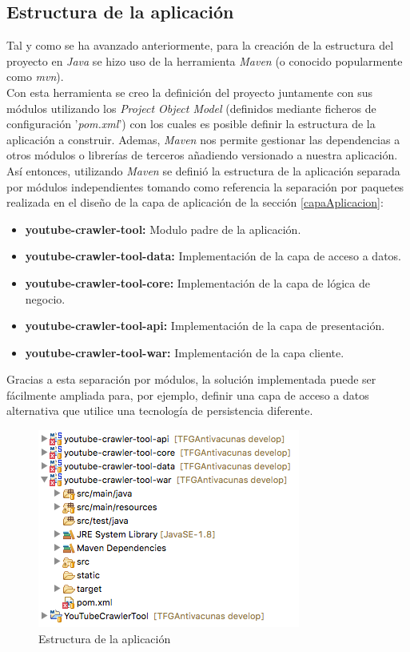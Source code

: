 \documentclass[11pt,a4paper]{article}
\begin{document}
\subsection{Estructura de la aplicación}
Tal y como se ha avanzado anteriormente, para la creación de la estructura del proyecto en \textit{Java} se hizo uso de la herramienta \textit{Maven} (o conocido popularmente como \textit{mvn}).
\\

Con esta herramienta se creo la definición del proyecto juntamente con sus módulos utilizando los \textit{Project Object Model} (definidos mediante ficheros de configuración '\textit{pom.xml}') con los cuales es posible definir la estructura de la aplicación a construir. Ademas, \textit{Maven} nos permite gestionar las dependencias a otros módulos o librerías de terceros añadiendo versionado a nuestra aplicación.
\\

Así entonces, utilizando \textit{Maven} se definió la estructura de la aplicación separada por módulos independientes tomando como referencia la separación por paquetes realizada en el diseño de la capa de aplicación de la sección \ref{capaAplicacion}:

\begin{itemize}
\item \textbf{youtube-crawler-tool:} Modulo padre de la aplicación.
\item \textbf{youtube-crawler-tool-data:} Implementación de la capa de acceso a datos.
\item \textbf{youtube-crawler-tool-core:} Implementación de la capa de lógica de negocio.
\item \textbf{youtube-crawler-tool-api:} Implementación de la capa de presentación.
\item \textbf{youtube-crawler-tool-war:} Implementación de la capa cliente.
\end{itemize}

Gracias a esta separación por módulos, la solución implementada puede ser fácilmente ampliada para, por ejemplo, definir una capa de acceso a datos alternativa que utilice una tecnología de persistencia diferente.

\begin{figure}[H]
\centering
\includegraphics[scale=0.60]{desarrollo/mvn.png}
\caption{Estructura de la aplicación}
\end{figure}
\end{document}
